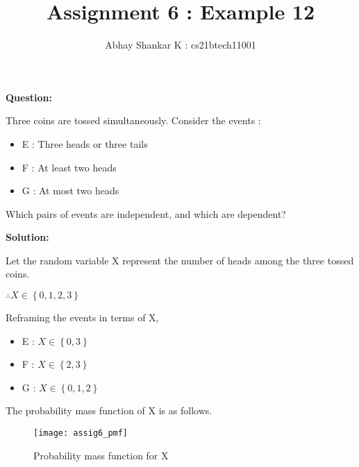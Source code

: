 \documentclass[journal,12pt,twocolumn]{IEEEtran}
\begin{document}
	\title{Assignment 6 : Example 12}
		\author{ Abhay Shankar K : cs21btech11001}

		\maketitle

		\bigskip

	\providecommand{\brak}[1]{\ensuremath{\left(#1\right)}}
	\providecommand{\sbrak}[1]{\ensuremath{\left[#1\right]}}
	\providecommand{\cbrak}[1]{\ensuremath{\left\{#1\right\}}}
	\newcommand{\solution}{\noindent \textbf{Solution: }}
	\newcommand{\question}{\noindent \textbf{Question: }}
	\providecommand{\pr}[2]{\ensuremath{P_{#1}\left(#2\right)}}
	
	
	\question
	
	Three coins are tossed simultaneously. Consider the events :
	
	\begin{itemize}
	
		\item E : Three heads or three tails
		
		\item F : At least two heads
		
		\item G : At most two heads
		
	\end{itemize}
	
	Which pairs of events are independent, and which are dependent?	
	
	
	\solution
	
	Let the random variable X represent the number of heads among the three tossed coins. 
	
	$\therefore X \in \cbrak{0, 1, 2, 3}$	
	
	Reframing the events in terms of X, 
	
	\begin{itemize}
	
		\item E : $X \in \cbrak{0, 3}$
		
		\item F : $X \in \cbrak{2, 3}$
		
		\item G : $X \in \cbrak{0, 1, 2}$
		
	\end{itemize}
	
	The probability mass function of X is as follows.
	
	\begin{figure}[h!]
	
		\caption{Probability mass function for X}
		
		\texttt{[image: assig6\_pmf]}
		
			\label{pmf}
	
	\end{figure}
	
\end{document}

